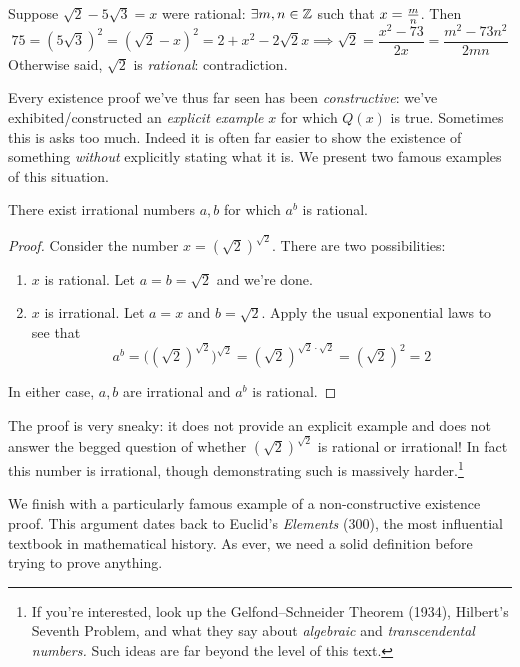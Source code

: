 \begin{example}{}{}
	Suppose $\sqrt 2-5\sqrt 3=x$ were rational: $\exists m,n\in\mathbb{Z}$ such that $x=\smash{\frac mn}$. Then
	\[
		75=(5\sqrt 3)^2=(\sqrt 2-x)^2=2+x^2-2\sqrt 2x \implies \sqrt 2=\frac{x^2-73}{2x} =\frac{m^2-73n^2}{2mn}
	\]
	Otherwise said, $\sqrt 2$ is \emph{rational}: contradiction.
\end{example}


\goodbreak



Every existence proof we've thus far seen has been \emph{constructive}: we've exhibited/constructed an \emph{explicit example} $x$ for which $Q(x)$ is true. Sometimes this is asks too much. Indeed it is often far easier to show the existence of something \emph{without} explicitly stating what it is. We present two famous examples of this situation.

\begin{thm}{}{}
	There exist irrational numbers $a,b$ for which $a^b$ is rational.
\end{thm}

\begin{proof}
	Consider the number $x=(\sqrt 2)^{\sqrt 2}$. There are two possibilities:
	\begin{enumerate}
	  \item $x$ is rational. Let $a=b=\sqrt 2$ and we're done.
	  \item $x$ is irrational. Let $a=x$ and $b=\sqrt 2$. Apply the usual exponential laws to see that
	  \[
	  	a^b=\bigl((\sqrt 2)^{\sqrt 2}\bigr)^{\sqrt 2}=(\sqrt 2)^{\sqrt 2\cdot\sqrt 2}= (\sqrt 2)^2=2
	  \]
	\end{enumerate}\vspace{-5pt}
	In either case, $a,b$ are irrational and $a^b$ is rational.
\end{proof}

The proof is very sneaky: it does not provide an explicit example and does not answer the begged question of whether $(\sqrt 2)^{\sqrt 2}$ is rational or irrational! In fact this number is irrational, though demonstrating such is massively harder.\footnote{If you're interested, look up the Gelfond--Schneider Theorem (1934), Hilbert's Seventh Problem, and what they say about \emph{algebraic} and \emph{transcendental numbers.} Such ideas are far beyond the level of this text.}
\bigbreak

We finish with a particularly famous example of a non-constructive existence proof. This argument dates back to Euclid's \emph{Elements} (300\BCE), the most influential textbook in mathematical history. As ever, we need a solid definition before trying to prove anything.

